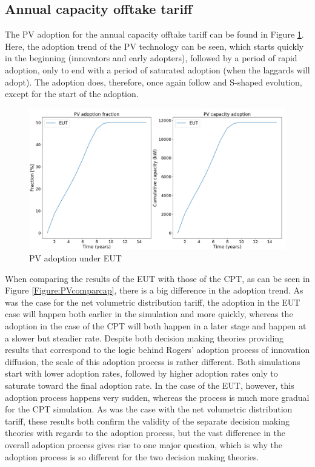 \subsection{Annual capacity offtake tariff}
The PV adoption for the annual capacity offtake tariff can be found in Figure \ref{Figure:PVeutcap}. Here, the adoption trend of the PV technology can be seen, which starts quickly in the beginning (innovators and early adopters), followed by a period of rapid adoption, only to end with a period of saturated adoption (when the laggards will adopt). The adoption does, therefore, once again follow and S-shaped evolution, except for the start of the adoption. 
\newline
\begin{figure}[h!]
\centering
\includegraphics[width=14cm]{EUTCompar/PVEUTcap.png}
\caption{PV adoption under EUT}
\label{Figure:PVeutcap}
\end{figure}
\noindent 
When comparing the results of the EUT with those of the CPT, as can be seen in Figure \ref{Figure:PVcomparcap}, there is a big difference in the adoption trend. As was the case for the net volumetric distribution tariff, the adoption in the EUT case will happen both earlier in the simulation and more quickly, whereas the adoption in the case of the CPT will both happen in a later stage and happen at a slower but steadier rate. Despite both decision making theories providing results that correspond to the logic behind Rogers' adoption process of innovation diffusion, the scale of this adoption process is rather different. Both simulations start with lower adoption rates, followed by higher adoption rates only to saturate toward the final adoption rate. In the case of the EUT, however, this adoption process happens very sudden, whereas the process is much more gradual for the CPT simulation. As was the case with the net volumetric distribution tariff, these results both confirm the validity of the separate decision making theories with regards to the adoption process, but the vast difference in the overall adoption process gives rise to one major question, which is why the adoption process is so different for the two decision making theories.

